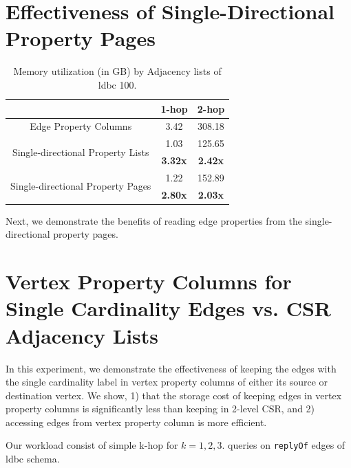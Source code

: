 \section{Effectiveness of Single-Directional Property Pages}
\label{exp:property-pages}

\begin{table}
	\centering
	\bgroup
	\setlength{\tabcolsep}{8pt}
	\def\arraystretch{1.2}%
	\begin{tabular}{ |c|c|c| } 
		\hline
		& \textbf{1-hop} & \textbf{2-hop} \\ 
		\hline \hline
		Edge Property Columns& 3.42 & 308.18 \\ 
		\hline
		\multirow{2}{*}{Single-directional Property Lists}& 1.03 & 125.65 \\ 
		& \textbf{3.32x} & \textbf{2.42x} \\ 
		\hline 
		\multirow{2}{*}{Single-directional Property Pages} & 1.22 & 152.89 \\ 
			& \textbf{2.80x} & \textbf{2.03x} \\ 
		\hline 
	\end{tabular}
	\egroup
	\captionsetup{justification=centering}
	\caption{Memory utilization (in GB) by Adjacency lists of \gls{ldbc} 100. }
	\label{tbl:mem1}
\end{table}

Next, we demonstrate the benefits of reading edge properties from the single-directional property pages.

\section{Vertex Property Columns for Single Cardinality Edges vs. CSR Adjacency Lists}
\label{exp:single-cardinality}

In this experiment, we demonstrate the effectiveness of keeping the edges with the single cardinality label in vertex property columns of either its source or destination vertex. We show, 1) that the storage cost of keeping edges in vertex property columns is significantly less than keeping in 2-level CSR, and 2) accessing edges from vertex property column is more efficient. 



Our workload consist of simple k-hop for $k=1,2,3$. queries on \texttt{replyOf} edges of \gls{ldbc} schema. 


